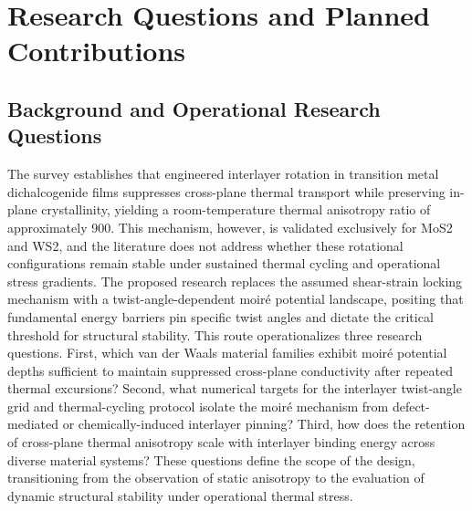 \documentclass[conference]{IEEEtran}
\begin{document}
\section{Research Questions and Planned Contributions}
\subsection{Background and Operational Research Questions}
The survey establishes that engineered interlayer rotation in transition metal dichalcogenide films suppresses cross-plane thermal transport while preserving in-plane crystallinity, yielding a room-temperature thermal anisotropy ratio of approximately 900. This mechanism, however, is validated exclusively for MoS2 and WS2, and the literature does not address whether these rotational configurations remain stable under sustained thermal cycling and operational stress gradients. The proposed research replaces the assumed shear-strain locking mechanism with a twist-angle-dependent moiré potential landscape, positing that fundamental energy barriers pin specific twist angles and dictate the critical threshold for structural stability. This route operationalizes three research questions. First, which van der Waals material families exhibit moiré potential depths sufficient to maintain suppressed cross-plane conductivity after repeated thermal excursions? Second, what numerical targets for the interlayer twist-angle grid and thermal-cycling protocol isolate the moiré mechanism from defect-mediated or chemically-induced interlayer pinning? Third, how does the retention of cross-plane thermal anisotropy scale with interlayer binding energy across diverse material systems? These questions define the scope of the design, transitioning from the observation of static anisotropy to the evaluation of dynamic structural stability under operational thermal stress.~\cite{cite_26ecaf73d88dfe33,cite_6b49ace365c37cc5}
\end{document}
